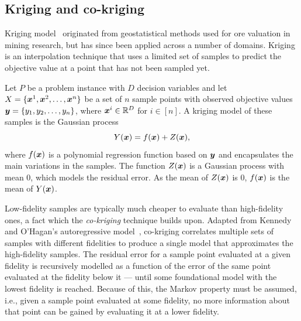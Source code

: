 \subsection{Kriging and co-kriging}

Kriging model~\cite{forrester2008engineering} originated from geostatistical methods used for ore valuation in mining research, but has since been applied across a number of domains. Kriging is an interpolation technique that uses a limited set of samples to predict the objective value at a point that has not been sampled yet.

Let $P$ be a problem instance with $D$ decision variables and let $X = \{\boldsymbol{x}^1,\boldsymbol{x}^2,\dots,\boldsymbol{x}^n\}$ be a set of $n$ sample points with observed objective values $\boldsymbol{y} = \{y_1,y_2,\dots,y_n\}$, where $\boldsymbol{x}^i \in \mathbb{R}^D$ for $i \in [n]$. A kriging model of these samples is the Gaussian process 
\begin{equation}
Y(\boldsymbol{x}) = f(\boldsymbol{x}) + Z(\boldsymbol{x}),\label{eq:krig}
\end{equation}
where $f(\boldsymbol{x})$ is a polynomial regression function based on $\boldsymbol{y}$ and encapsulates the main variations in the samples. The function $Z(\boldsymbol{x})$ is a Gaussian process with mean $0$, which models the residual error. As the mean of $Z(\boldsymbol{x})$ is 0, $f(\boldsymbol{x})$ is the mean of $Y(\boldsymbol{x})$. 



Low-fidelity samples are typically much cheaper to evaluate than high-fidelity ones, a fact which the \emph{co-kriging} technique builds upon. Adapted from Kennedy and O'Hagan's autoregressive model~\cite{kennedy2000predicting}, co-kriging correlates multiple sets of samples with different fidelities to produce a single model that approximates the high-fidelity samples. The residual error for a sample point evaluated at a given fidelity is recursively modelled as a function of the error of the same point evaluated at the fidelity below it --- until some foundational model with the lowest fidelity is reached. Because of this, the Markov property must be assumed, i.e., given a sample point evaluated at some fidelity, no more information about that point can be gained by evaluating it at a lower fidelity.

